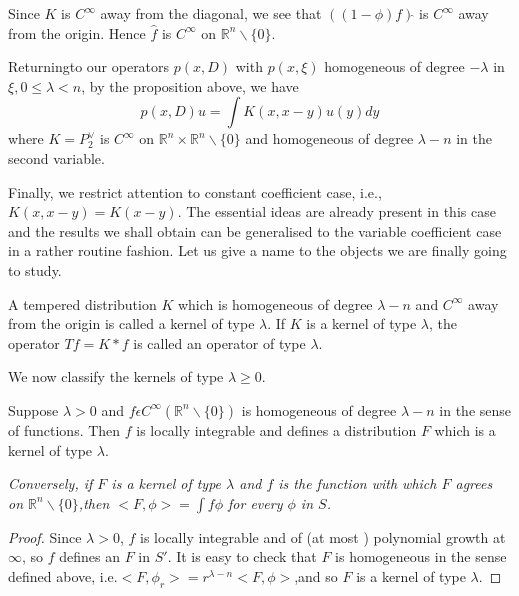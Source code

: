  
 Since $K$ is $C^{\infty}$ away from the diagonal, we see that $((1-
 \phi ) f) \hat { } $ is $C^{\infty}$ away from the origin. Hence
 $\hat{f} $ is $C^\infty $ on $\mathbb{R}^n \backslash \{0\}$. 
 
 Returning\pageoriginale to our operators $p(x, D) $ with $p( x,\xi )$ homogeneous
 of degree $- \lambda $ in $ \xi,  0 \leq \lambda < n$, by the
 proposition above, we have 
 $$
 p(x,D)u= \int K (x, x-y) u (y) dy 
 $$
  where $K= P _2^\vee$ is $C^ \infty $ on $ \mathbb{R}^n \times
  \mathbb{R}^n \backslash \{0\}$ and homogeneous of degree $\lambda-n
  $ in the second variable. 
 
 Finally, we restrict attention to constant coefficient case, i.e.,
 $K(x, x-y) = K (x-y)$. The essential  ideas are already present in
 this case and the results we shall obtain can be generalised to the
 variable coefficient case in a rather routine fashion. Let us give  a
 name  to the objects we are finally going to study.  
 
\setcounter{defi}{2}
\begin{defi}\label{chap5:def5.3}%
  A tempered distribution $K$ which is homogeneous of 	  degree
  $\lambda -n $ and $C^\infty$ away from the origin is called 
    a kernel of type $\lambda$. If $K$ is a kernel of type $\lambda$,
  the operator $Tf= K * f $ is called an operator of type
  $\lambda$.   
\end{defi} 
 
 We now classify the kernels of type $\lambda \ge 0$.
\setcounter{prop}{3}
 \begin{prop}\label{chap5:prop5.4}%
   Suppose $\lambda > 0$ and $f \epsilon C ^\infty (
  \mathbb{R}^n \backslash \{0\})$ is homogeneous of degree $\lambda -n
  $ in the sense of functions. Then $f$ is locally integrable and
  defines a distribution $F$  which is a kernel of type $\lambda$. 
 \end{prop} 
 
 \textit{Conversely, if $F$ is a kernel of type $\lambda$ and  $f$ is
   the function with which $F$ agrees on $\mathbb{R}^ n \backslash
   \{0\}$,then $< F,  \phi > = \int f \phi $ for every $\phi $ in
   $S$.} 
 
 \begin{proof}
   Since $\lambda > 0 $, $f$ is locally integrable and of (at most )
   polynomial growth at $\infty$, so $f$ defines an $F$ in $S'$. It is
   easy to check that $F$ is homogeneous in the sense defined above, 
   i.e.$ < F, \phi _r > = r^{\lambda-n}<F, \phi >$,\pageoriginale and so $F$ is a
   kernel of type $\lambda$. 
 \end{proof}
 
